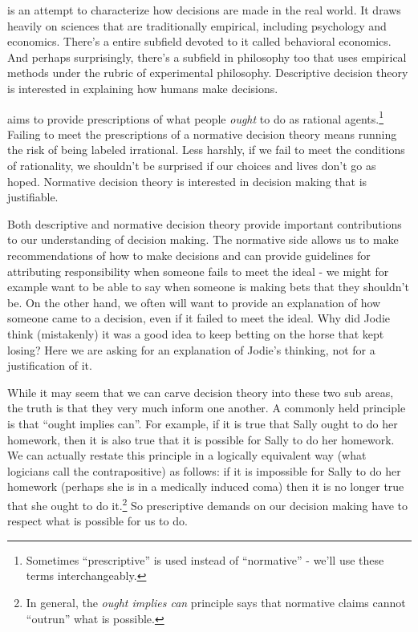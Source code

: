 \documentclass[]{tufte-book}
\begin{document}
 is an attempt to characterize how decisions are made in the real world. It draws heavily on sciences that are traditionally empirical, including psychology and economics. There's a entire subfield devoted to it called behavioral economics. And perhaps surprisingly, there's a subfield in philosophy too that uses empirical methods under the rubric of experimental philosophy. Descriptive decision theory is interested in explaining how humans make decisions.

 aims to provide prescriptions of what people \emph{ought} to do as rational agents.\footnote{Sometimes ``prescriptive'' is used instead of ``normative'' - we'll use these terms interchangeably.} Failing to meet the prescriptions of a normative decision theory means running the risk of being labeled irrational. Less harshly, if we fail to meet the conditions of rationality, we shouldn't be surprised if our choices and lives don't go as hoped. Normative decision theory is interested in decision making that is justifiable.

Both descriptive and normative decision theory provide important contributions to our understanding of decision making. The normative side allows us to make recommendations of how to make decisions and can provide guidelines for attributing responsibility when someone fails to meet the ideal - we might for example want to be able to say when someone is making bets that they shouldn't be. On the other hand, we often will want to provide an explanation of how someone came to a decision, even if it failed to meet the ideal. Why did Jodie think (mistakenly) it was a good idea to keep betting on the horse that kept losing? Here we are asking for an explanation of Jodie's thinking, not for a justification of it.

While it may seem that we can carve decision theory into these two sub areas, the truth is that they very much inform one another. A commonly held principle is that ``ought implies can''. For example, if it is true that Sally ought to do her homework, then it is also true that it is possible for Sally to do her homework. We can actually restate this principle in a logically equivalent way (what logicians call the contrapositive) as follows: if it is impossible for Sally to do her homework (perhaps she is in a medically induced coma) then it is no longer true that she ought to do it.\footnote{In general, the \emph{ought implies can} principle says that normative claims cannot ``outrun'' what is possible.} So prescriptive demands on our decision making have to respect what is possible for us to do.
\end{document}
